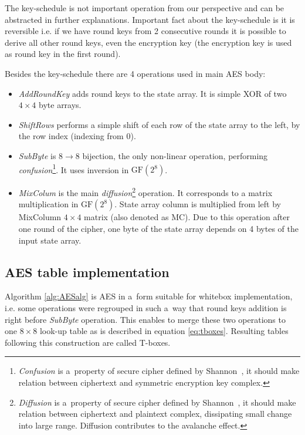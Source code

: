 \documentclass[11pt,oneside,final]{fithesis2}
\newcommand{\gfe}{\ensuremath{\text{GF}\left(2^8\right)}}
\begin{document}
    The key-schedule is not important operation from our perspective and can be abstracted in further explanations. Important fact about the key-schedule is it is reversible i.e. 
    if we have round keys from 2 consecutive rounds it is possible to derive all other round keys, even the encryption key (the encryption key is used as round key in the first round).
    
    Besides the key-schedule there are 4 operations used in main AES body:
    \begin{itemize}
     \item \emph{AddRoundKey} adds round keys to the state array. It is simple XOR of two $4\times4$ byte arrays.
     \item \emph{ShiftRows} performs a simple shift of each row of the state array to the left, by the row index (indexing from 0).
     \item \emph{SubByte} is $8 \rightarrow 8$ bijection, the only non-linear operation, performing 
	\emph{confusion}\footnote{\emph{Confusion} is a~property of secure cipher defined by Shannon~\citep{shannon-otp}, it should make relation between ciphertext and symmetric encryption
	    key complex.}. It uses inversion in $\gfe$.
     \item \emph{MixColum} is the main \emph{diffusion}\footnote{\emph{Diffusion} is a~property of secure cipher defined by Shannon~\citep{shannon-otp}, it should make relation between
	    ciphertext and plaintext complex, dissipating small change into large range. Diffusion contributes to the avalanche effect. } operation. It corresponds to a matrix multiplication in $\gfe$. 
	    State array column is multiplied from left by MixColumn $4 \times 4$ matrix (also denoted as MC). Due to this operation after one round of the cipher, 
	    one byte of the state array depends on 4 bytes of the input state array.
    \end{itemize}
    
    \subsection{AES table implementation}\label{sec:aes_table}
    Algorithm \ref{alg:AESalg} is AES in a~form suitable for whitebox implementation, i.e. some operations were regrouped in such a~way that round keys addition 
    is right before \emph{SubByte} operation. This enables to merge these two operations to one $8\times8$ look-up table as is described in equation \ref{eq:tboxes}.
    Resulting tables following this construction are called T-boxes.
    
\end{document}
